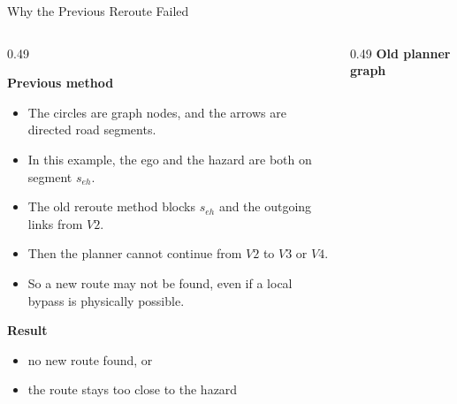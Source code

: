 \documentclass[aspectratio=169]{beamer}
\begin{document}
\begin{frame}{Why the Previous Reroute Failed}
\small
\begin{columns}[T,onlytextwidth]
\begin{column}{0.49\textwidth}
\begin{flushleft}
\textbf{Previous method}\\[0.3em]
\begin{itemize}
\setlength\itemsep{0.3em}
\item The circles are graph nodes, and the arrows are directed road segments.
\item In this example, the ego and the hazard are both on segment \(s_{eh}\).
\item The old reroute method blocks \(s_{eh}\) and the outgoing links from \(V2\).
\item Then the planner cannot continue from \(V2\) to \(V3\) or \(V4\).
\item So a new route may not be found, even if a local bypass is physically possible.
\end{itemize}

\textbf{Result}\\[0.3em]
\begin{itemize}
\setlength\itemsep{0.3em}
\item no new route found, or
\item the route stays too close to the hazard
\end{itemize}
\end{flushleft}
\end{column}

\begin{column}{0.49\textwidth}
\centering
\textbf{Old planner graph}\\[0.35em]
\end{column}
\end{columns}
\end{frame}
\end{document}
